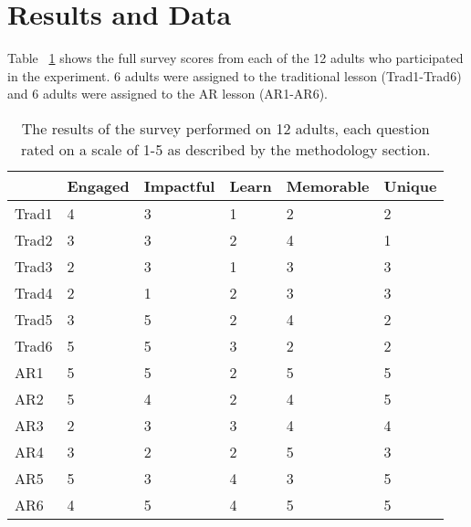 \documentclass{vgtc}                          %
\begin{document}
\section{Results and Data}
Table ~\ref{table:surveyResults} shows the full survey scores from each of the 12 adults who participated in the experiment. 6 adults were assigned to the traditional lesson (Trad1-Trad6) and 6 adults were assigned to the AR lesson (AR1-AR6). 
\begin{table}[!h]
\renewcommand{\arraystretch}{1.5}
\begin{tabular}{l|l|l|l|l|l}
      & Engaged & Impactful & Learn & Memorable & Unique \\ \hline
Trad1 & 4       & 3         & 1     & 2         & 2      \\
Trad2 & 3       & 3         & 2     & 4         & 1      \\
Trad3 & 2       & 3         & 1     & 3         & 3      \\
Trad4 & 2       & 1         & 2     & 3         & 3      \\
Trad5 & 3       & 5         & 2     & 4         & 2      \\
Trad6 & 5       & 5         & 3     & 2         & 2      \\
AR1   & 5       & 5         & 2     & 5         & 5      \\
AR2   & 5       & 4         & 2     & 4         & 5      \\
AR3   & 2       & 3         & 3     & 4         & 4      \\
AR4   & 3       & 2         & 2     & 5         & 3      \\
AR5   & 5       & 3         & 4     & 3         & 5      \\
AR6   & 4       & 5         & 4     & 5         & 5     
\end{tabular}
\vspace*{10mm}
\caption{The results of the survey performed on 12 adults, each question rated on a scale of 1-5 as described by the methodology section.}
\label{table:surveyResults}
\end{table}
\end{document}

